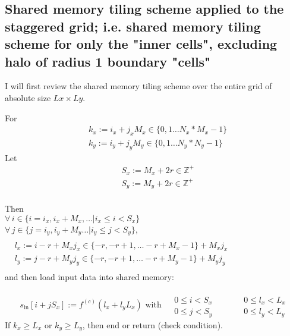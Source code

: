 \documentclass[10pt]{amsart}
\begin{document}
\begin{multicols*}{2}
\subsection{Shared memory tiling scheme applied to the staggered grid; i.e. shared memory tiling scheme for only the "inner cells", excluding halo of radius 1 boundary "cells"}

I will first review the shared memory tiling scheme over the entire grid of absolute size $Lx\times Ly$.  




For 
\[
\begin{aligned}
	& k_x := i_x + j_x M_x \in \lbrace 0 ,1\dots N_x*M_x-1 \rbrace \\
	& k_y := i_y + j_y M_y \in \lbrace 0 ,1\dots N_y*N_y-1 \rbrace
\end{aligned}
\]
Let 
\[
\begin{aligned}
	& S_x:= M_x + 2r \in \mathbb{Z}^+ \\ 
	& S_y:= M_y + 2r \in \mathbb{Z}^+ \\ 
\end{aligned}
\]

Then   \\

$\forall \, i \in \lbrace i = i_x, i_x + M_x, \dots | i_x \leq i < S_x \rbrace $ \\ 
\phantom{ $\forall \, $ \qquad \, } $\forall \, j \in \lbrace j = i_y , i_y + M_y \dots | i_y \leq j < S_y \rbrace$, \\
\phantom{ $\forall \, $ \qquad \, \qquad \, } $\begin{aligned} & \quad \\
	& l_x := i-r + M_x j_x \in \lbrace -r , -r+1 , \dots -r +M_x -1\rbrace + M_x j_x \\ 
	& l_y := j-r + M_y j_y \in \lbrace -r , -r+1 , \dots -r +M_y -1\rbrace + M_y j_y \\ 
\end{aligned}$ \\

and then load input data into shared memory:

\begin{equation}
	s_{\text{in}}[i+jS_x] := f^{(c)}(l_x + l_y L_x) \text{ with } \begin{aligned} & \qquad \, \\ & 0 \leq i < S_x \\ 
& 0 \leq j < S_y \end{aligned} \qquad \,  \begin{aligned} & \qquad \, \\ & 0 \leq l_x < L_x \\ 
& 0 \leq l_y < L_y \end{aligned}
\end{equation}
If $k_x\geq L_x$ or $k_y \geq L_y$, then end or return (check condition).  


\end{multicols*}
\end{document}
